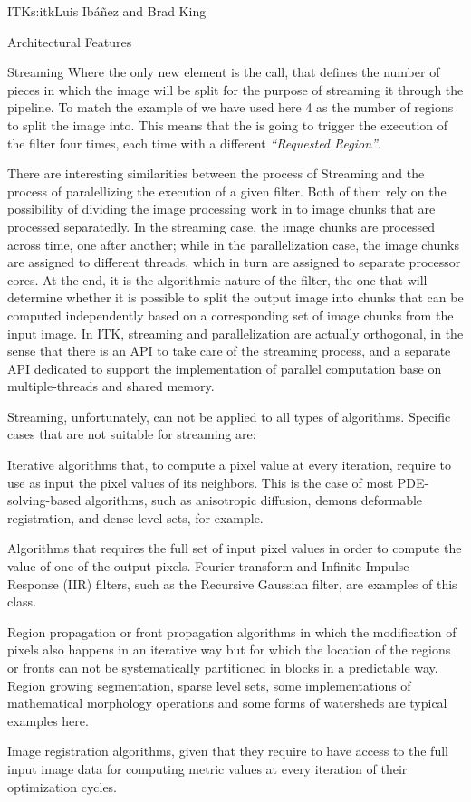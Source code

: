 \begin{aosachapter}{ITK}{s:itk}{Luis Ib\'{a}\~{n}ez and Brad King}
\begin{aosasect1}{Architectural Features}
\begin{aosasect2}{Streaming}
Where the only new element is the  call,
that defines the number of pieces in which the image will be split for the
purpose of streaming it through the pipeline. To match the example of
 we have used here 4 as the number of regions to
split the image into. This means that the  is going to trigger the
execution of the  filter four times, each time with a different
\emph{``Requested Region''}.

There are interesting similarities between the process of Streaming
and the process of paralellizing the execution of a given filter. Both
of them rely on the possibility of dividing the image processing work
in to image chunks that are processed separatedly. In the streaming
case, the image chunks are processed across time, one after another;
while in the parallelization case, the image chunks are assigned to
different threads, which in turn are assigned to separate processor
cores. At the end, it is the algorithmic nature of the filter, the
one that will determine whether it is possible to split the output
image into chunks that can be computed independently based on a
corresponding set of image chunks from the input image. In ITK,
streaming and parallelization are actually orthogonal, in the sense
that there is an API to take care of the streaming process, and a
separate API dedicated to support the implementation of parallel
computation base on multiple-threads and shared memory.

Streaming, unfortunately, can not be applied to all types of algorithms. Specific
cases that are not suitable for streaming are:

\begin{aosaitemize}
\item Iterative algorithms that, to compute a pixel value at every iteration,
require to use as input the pixel values of its neighbors. This is the case of
most PDE-solving-based algorithms, such as anisotropic diffusion, demons
deformable registration, and dense level sets, for example.
\item Algorithms that requires the full set of input pixel values in order to
compute the value of one of the output pixels. Fourier transform and Infinite
Impulse Response (IIR) filters, such as the Recursive Gaussian filter, are
examples of this class.
\item Region propagation or front propagation algorithms in which the
modification of pixels also happens in an iterative way but for which the
location of the regions or fronts can not be systematically partitioned in
blocks in a predictable way. Region growing segmentation, sparse level sets,
some implementations of mathematical morphology operations and some forms of
watersheds are typical examples here.
\item Image registration algorithms, given that they require to have access to
the full input image data for computing metric values at every iteration of
their optimization cycles.
\end{aosaitemize}


\end{aosasect2}
\end{aosasect1}
\end{aosachapter}

